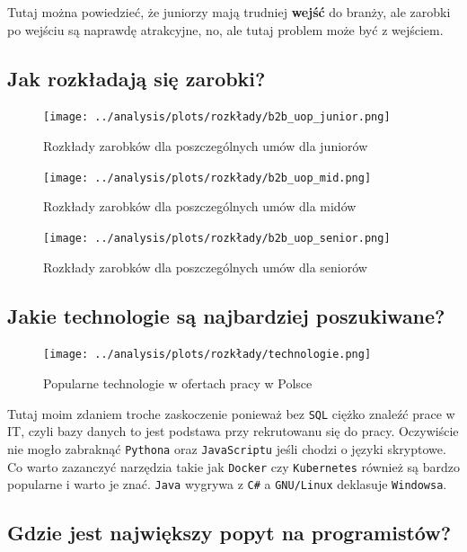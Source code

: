 \documentclass{article}
\begin{document}
\quad Tutaj można powiedzieć, że juniorzy mają trudniej \textbf{wejść} do branży, ale zarobki po wejściu są naprawdę atrakcyjne,
no, ale tutaj problem może być z wejściem.


\subsection{Jak rozkładają się zarobki?}

\begin{figure}[H]
    \centering
    \texttt{[image: ../analysis/plots/rozkłady/b2b\_uop\_junior.png]}
    \caption{Rozkłady zarobków dla poszczególnych umów dla juniorów}
\end{figure}

\begin{figure}[H]
    \centering
    \texttt{[image: ../analysis/plots/rozkłady/b2b\_uop\_mid.png]}
    \caption{Rozkłady zarobków dla poszczególnych umów dla midów}
\end{figure}

\begin{figure}[H]
    \centering
    \texttt{[image: ../analysis/plots/rozkłady/b2b\_uop\_senior.png]}
    \caption{Rozkłady zarobków dla poszczególnych umów dla seniorów}
\end{figure}


\subsection{Jakie technologie są najbardziej poszukiwane?}

\begin{figure}[H]
    \centering
    \texttt{[image: ../analysis/plots/rozkłady/technologie.png]}
    \caption{Popularne technologie w ofertach pracy w Polsce}
\end{figure}

\quad Tutaj moim zdaniem troche zaskoczenie ponieważ bez \texttt{SQL} ciężko znaleźć prace w IT, czyli
bazy danych to jest podstawa przy rekrutowanu się do pracy. Oczywiście nie mogło zabraknąć \texttt{Pythona} oraz \texttt{JavaScriptu} jeśli chodzi o języki skryptowe.
Co warto zazanczyć narzędzia takie jak \texttt{Docker} czy \texttt{Kubernetes} również są bardzo popularne i warto je znać. \texttt{Java} wygrywa z \texttt{C\#} a \texttt{GNU/Linux} deklasuje \texttt{Windowsa}.


\subsection{Gdzie jest największy popyt na programistów?}
\end{document}
